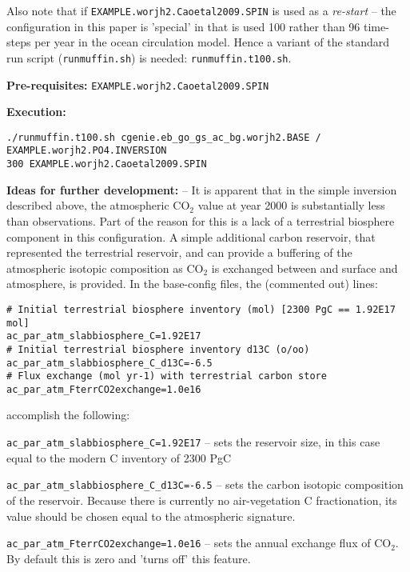 \documentclass[10pt,twoside]{article}
\begin{document}
Also note that if \texttt{EXAMPLE.worjh2.Caoetal2009.SPIN} is used as a \textit{re-start} -- the configuration in this paper is 'special' in that is used 100 rather than 96 time-steps per year in the ocean circulation model. Hence a variant of the standard run script (\texttt{runmuffin.sh}) is needed: \texttt{runmuffin.t100.sh}.

\noindent \textbf{Pre-requisites:} \texttt{EXAMPLE.worjh2.Caoetal2009.SPIN}

\noindent \textbf{Execution:} 
\vspace{-10pt}\small\begin{verbatim}./runmuffin.t100.sh cgenie.eb_go_gs_ac_bg.worjh2.BASE / EXAMPLE.worjh2.PO4.INVERSION  
300 EXAMPLE.worjh2.Caoetal2009.SPIN\end{verbatim}\normalsize\vspace{-10pt}

\noindent \textbf{Ideas for further development:} -- It is apparent that in the simple inversion described above, the atmospheric CO$_{2}$ value at year 2000 is substantially less than observations. Part of the reason for this is a lack of a terrestrial biosphere component in this configuration. A simple additional carbon reservoir, that represented the terrestrial reservoir, and can provide a buffering of the atmospheric isotopic composition as CO$_{2}$ is exchanged between and surface and atmosphere, is provided. In the base-config files, the (commented out) lines:
\vspace{-10pt}\begin{verbatim}
# Initial terrestrial biosphere inventory (mol) [2300 PgC == 1.92E17 mol]
ac_par_atm_slabbiosphere_C=1.92E17
# Initial terrestrial biosphere inventory d13C (o/oo)
ac_par_atm_slabbiosphere_C_d13C=-6.5
# Flux exchange (mol yr-1) with terrestrial carbon store
ac_par_atm_FterrCO2exchange=1.0e16
\end{verbatim}\vspace{-10pt}accomplish the following:

\begin{compactitem}
        \item \texttt{ac\_par\_atm\_slabbiosphere\_C=1.92E17} -- sets the reservoir size, in this case equal to the modern C inventory of 2300 PgC
        \item \texttt{ac\_par\_atm\_slabbiosphere\_C\_d13C=-6.5} -- sets the carbon isotopic composition of the reservoir. Because there is currently no air-vegetation C fractionation, its value should be chosen equal to the atmospheric signature.
        \item \texttt{ac\_par\_atm\_FterrCO2exchange=1.0e16} -- sets the annual exchange flux of CO$_{2}$. By default this is zero and 'turns off' this feature.
\end{compactitem}
\end{document}
